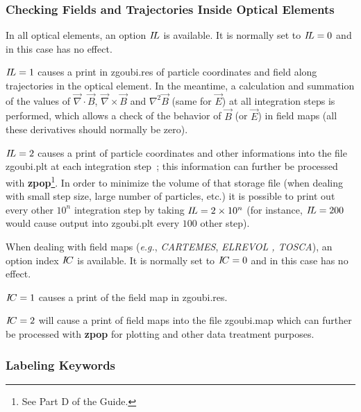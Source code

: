 \subsubsection{Checking Fields and Trajectories Inside Optical Elements}  \label{sec4.6.1}

In all optical elements, an option $ I\!L $ is available.  It
is normally set to $I\!L =0$ and in this case has no effect.

\noindent $ I\!L=1 $ causes a print  in zgoubi.res  of particle 
coordinates and field
along trajectories in the optical element.  In the meantime, a calculation and summation of
the values of $ \vec  \nabla \cdot\vec  B$, 
 $ \vec  \nabla \times\vec  B $ and $ \nabla^2\vec  B $ (same for $\vec E$) at all 
integration steps is performed, which allows a check of the behavior of 
$ \vec  B $ (or $ \vec  E $) in field maps (all these derivatives should normally be zero).

\noindent $ I\!L=2 $ causes a print   of particle coordinates and other 
informations into the file  zgoubi.plt at each integration step~; this information 
 can further be processed with 
\textbf{zpop}\footnote{See Part D of the Guide.}. In order to minimize  the volume of 
that storage file (when dealing with small step size, large number of particles, etc.) it is possible 
to print out  every other $10^n$ integration step by taking $ I\!L=2 \times 10^n $ (for instance, 
 $ I\!L=200 $ would cause output into zgoubi.plt every $100$ other step). 
\medskip

\noindent When dealing with field  maps (\emph{e.g.}, \textsl{CARTEMES}, \textsl{ELREVOL
, TOSCA}), an option index $ I\!C $ is available.
  It is normally set to $I\!C =0$ and in this case has no effect.
 
\noindent $ I\!C=1 $ causes a print of the field map in zgoubi.res. 

\noindent $ I\!C=2 $ will cause a print   of field maps into the file  zgoubi.map 
which can further be processed with \textbf{zpop} for plotting and other data treatment purposes. 


 \subsubsection{Labeling Keywords}\label{sec4.6.8}

